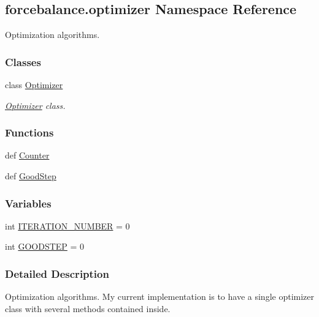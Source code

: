 \hypertarget{namespaceforcebalance_1_1optimizer}{\subsection{forcebalance.\-optimizer Namespace Reference}
\label{namespaceforcebalance_1_1optimizer}
}


Optimization algorithms.  


\subsubsection*{Classes}
\begin{DoxyCompactItemize}
\item 
class \hyperlink{classforcebalance_1_1optimizer_1_1Optimizer}{Optimizer}
\begin{DoxyCompactList}\small\item\em \hyperlink{classforcebalance_1_1optimizer_1_1Optimizer}{Optimizer} class. \end{DoxyCompactList}\end{DoxyCompactItemize}
\subsubsection*{Functions}
\begin{DoxyCompactItemize}
\item 
def \hyperlink{namespaceforcebalance_1_1optimizer_ae1f6c649703a22b2f767a5f6bf53297b}{Counter}
\item 
def \hyperlink{namespaceforcebalance_1_1optimizer_ab43948ecf30c90d319e0c0b107fe484a}{Good\-Step}
\end{DoxyCompactItemize}
\subsubsection*{Variables}
\begin{DoxyCompactItemize}
\item 
int \hyperlink{namespaceforcebalance_1_1optimizer_ac3e728fa9f2dacdcca7e1b51d9f2a49e}{I\-T\-E\-R\-A\-T\-I\-O\-N\-\_\-\-N\-U\-M\-B\-E\-R} = 0
\item 
int \hyperlink{namespaceforcebalance_1_1optimizer_a7b0cf561a0ec911ee4b217cb0b05a28e}{G\-O\-O\-D\-S\-T\-E\-P} = 0
\end{DoxyCompactItemize}


\subsubsection{Detailed Description}
Optimization algorithms. My current implementation is to have a single optimizer class with several methods contained inside.

